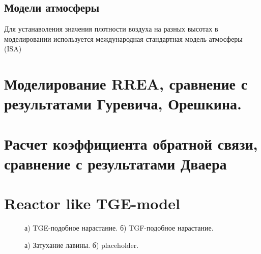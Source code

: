 \subsection{Модели атмосферы}
Для устанаволения значения плотности воздуха на разных высотах в моделировании используется международная стандартная модель атмосферы (ISA)


\section{Моделирование RREA, сравнение с результатами Гуревича, Орешкина.}\label{sec:thunderstorm/rrea}



\section{Расчет коэффициента обратной связи, сравнение с результатами Дваера}\label{sec:thunderstorm/rdfm}
\section{Reactor like TGE-model}\label{sec:thunderstorm/reactor}

\begin{figure}[t]
    \begin{center}
        \begin{minipage}[h]{0.49\linewidth}
        \end{minipage}
        \hfill
        \begin{minipage}[h]{0.49\linewidth}
        \end{minipage}
        \caption{а) TGE-подобное нарастание. б) TGF-подобное нарастание.}
    \end{center}
    \label{thunder:rl_1}
\end{figure}


\begin{figure}[t]
    \begin{center}
        \begin{minipage}[h]{0.49\linewidth}
        \end{minipage}
        \hfill
        \begin{minipage}[h]{0.49\linewidth}
        \end{minipage}
        \caption{а) Затухание лавины. б) placeholder.}
    \end{center}
    \label{thunder:rl_2}
\end{figure}

\clearpage
